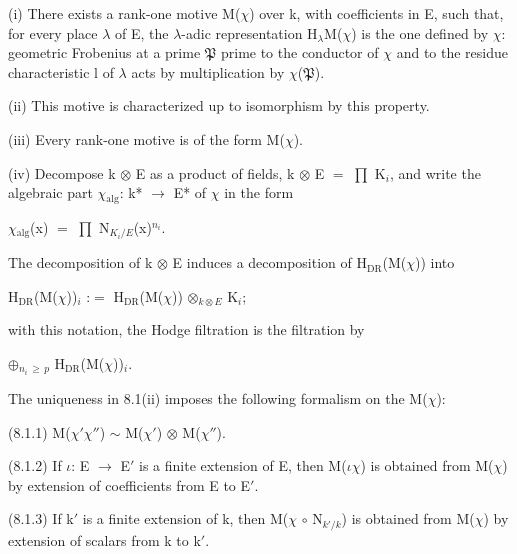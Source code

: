 \documentclass[10pt,twoside]{article}
\begin{document}
(i) There exists a rank-one motive M(\ensuremath{χ}) over k, with coefficients in E, such that, for every place \ensuremath{λ} of E, the \ensuremath{λ}-adic representation H\ensuremath{_{λ}}M(\ensuremath{χ}) is the one defined by \ensuremath{χ}: geometric Frobenius at a prime \ensuremath{𝔓} prime to the conductor of \ensuremath{χ} and to the residue characteristic l of \ensuremath{λ} acts by multiplication by \ensuremath{χ}(\ensuremath{𝔓}).\par
(ii) This motive is characterized up to isomorphism by this property.\par
(iii) Every rank-one motive is of the form M(\ensuremath{χ}).\par
(iv) Decompose k \ensuremath{⊗} E as a product of fields, k \ensuremath{⊗} E \ensuremath{=} \ensuremath{∏} K\ensuremath{_{i}}, and write the algebraic part \ensuremath{χ}\ensuremath{_{\mathrm{alg}}}: k* \ensuremath{→} E* of \ensuremath{χ} in the form\par
\ensuremath{χ}\ensuremath{_{\mathrm{alg}}}(x) \ensuremath{=} \ensuremath{∏} N\ensuremath{_{K_i/E}}(x)\ensuremath{^{n_i}}.\par
The decomposition of k \ensuremath{⊗} E induces a decomposition of H\ensuremath{_{\mathrm{DR}}}(M(\ensuremath{χ})) into\par
H\ensuremath{_{\mathrm{DR}}}(M(\ensuremath{χ}))\ensuremath{_{i}} :\ensuremath{=} H\ensuremath{_{\mathrm{DR}}}(M(\ensuremath{χ})) \ensuremath{⊗}\ensuremath{_{k⊗E}} K\ensuremath{_{i}};\par
with this notation, the Hodge filtration is the filtration by\par
\ensuremath{⊕}\ensuremath{_{n_i\,≥\,p}} H\ensuremath{_{\mathrm{DR}}}(M(\ensuremath{χ}))\ensuremath{_{i}}.\par
The uniqueness in 8.1(ii) imposes the following formalism on the M(\ensuremath{χ}):\par
(8.1.1)    M(\ensuremath{χ}\ensuremath{′}\ensuremath{χ}\ensuremath{″}) \ensuremath{∼} M(\ensuremath{χ}\ensuremath{′}) \ensuremath{⊗} M(\ensuremath{χ}\ensuremath{″}).\par
(8.1.2) If \ensuremath{ι}: E \ensuremath{→} E\ensuremath{′} is a finite extension of E, then M(\ensuremath{ι}\ensuremath{χ}) is obtained from M(\ensuremath{χ}) by extension of coefficients from E to E\ensuremath{′}.\par
(8.1.3) If k\ensuremath{′} is a finite extension of k, then M(\ensuremath{χ} \ensuremath{∘} N\ensuremath{_{k′/k}}) is obtained from M(\ensuremath{χ}) by extension of scalars from k to k\ensuremath{′}.\par
\end{document}
